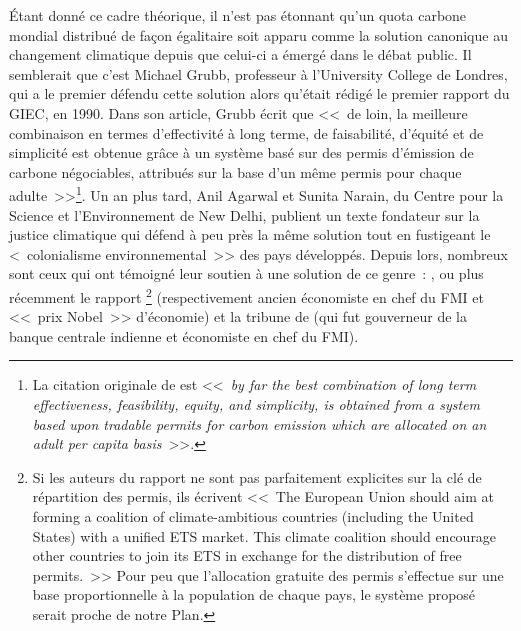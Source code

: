 \documentclass[a5paper,french]{memoir}
\begin{document}
Étant donné ce cadre théorique, il n'est pas étonnant qu'un quota carbone mondial distribué de façon égalitaire soit apparu comme la solution canonique au changement climatique depuis que celui-ci a émergé dans le débat public. Il semblerait que c'est Michael Grubb, professeur à l'University College de Londres, qui a le premier défendu cette solution alors qu'était rédigé le premier rapport du GIEC, en 1990. Dans son article, Grubb écrit que <<~de loin, la meilleure combinaison en termes d'effectivité à long terme, de faisabilité, d'équité et de simplicité est obtenue grâce à un système basé sur des permis d'émission de carbone négociables, attribués sur la base d'un même permis pour chaque adulte~>>\footnote{La citation originale de \citet{grubb_greenhouse_1990} est <<~\textit{by far the best combination of long term effectiveness, feasibility, equity, and simplicity, is obtained from a system based upon tradable permits for carbon emission which are allocated on an adult per capita basis}~>>.}. Un an plus tard, Anil Agarwal et Sunita Narain, du Centre pour la Science et l'Environnement de New Delhi, publient un texte fondateur sur la justice climatique qui défend à peu près la même solution tout en fustigeant le <~colonialisme environnemental~>> des pays développés. %
Depuis lors, nombreux sont ceux qui ont témoigné leur soutien à une solution de ce genre~: \citet{bertram_tradeable_1992,baer_equity_2000,jamieson_climate_2001}, ou plus récemment le rapport \citet{blanchard_major_2021}\footnote{Si les auteurs du rapport ne sont pas parfaitement explicites sur la clé de répartition des permis, ils écrivent <<~The European Union should aim at forming a coalition of climate-ambitious countries (including the United States) with a unified ETS market. This climate coalition should encourage other countries to join its ETS in exchange for the distribution of free permits.~>> Pour peu que l'allocation gratuite des permis s'effectue sur une base proportionnelle à la population de chaque pays, le système proposé serait proche de notre Plan.} (respectivement ancien économiste en chef du FMI et <<~prix Nobel~>> d'économie) et la tribune de \citet{rajan_global_2021} (qui fut gouverneur de la banque centrale indienne et économiste en chef du FMI). 
\end{document}

